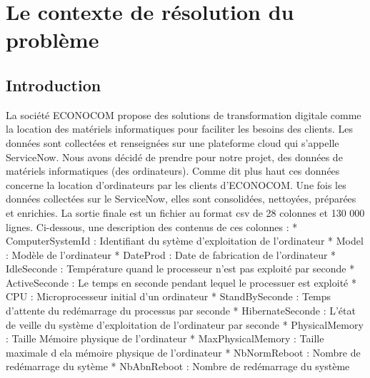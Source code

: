 \chapter{Le contexte de résolution du problème}
\minitoc
\newpage
 
\section{Introduction}

La société ECONOCOM propose des solutions de transformation digitale comme la location des matériels informatiques pour faciliter les besoins des clients. Les données sont collectées et renseignées sur une plateforme cloud qui s'appelle ServiceNow. Nous avons décidé de prendre pour notre projet, des données de matériels informatiques (des ordinateurs).
Comme dit plus haut ces données concerne la location d'ordinateurs par les clients d'ECONOCOM.
Une fois les données collectées sur le ServiceNow, elles sont consolidées, nettoyées, préparées et enrichies.
La sortie finale est un fichier au format csv de 28 colonnes et 130 000 lignes.
\newline
Ci-dessous, une description des contenus de ces colonnes :
\newline
* ComputerSystemId : Identifiant du sytème d'exploitation de l'ordinateur 
\newline
* Model : Modèle de l'ordinateur
\newline
* DateProd : Date de fabrication de l'ordinateur
\newline
* IdleSeconde :  Température quand le processeur n'est pas exploité par seconde
\newline
* ActiveSeconde :  Le temps en seconde pendant lequel le processuer est exploité
\newline
* CPU :  Microprocesseur initial d'un ordinateur
\newline
* StandBySeconde : Temps d'attente du redémarrage du processus par seconde
\newline
* HibernateSeconde :  L'état de veille du système d'exploitation de l'ordinateur par seconde
\newline
* PhysicalMemory :  Taille Mémoire physique de l'ordinateur
\newline
* MaxPhysicalMemory : Taille maximale d ela mémoire physique de l'ordinateur 
\newline
* NbNormReboot : Nombre de redémarrage du sytème
\newline
* NbAbnReboot : Nombre de redémarrage du système
